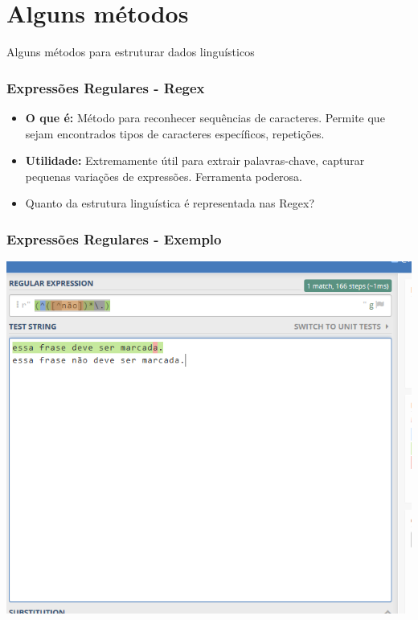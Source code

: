 \documentclass[11pt]{beamer}
\begin{document}
\section{Alguns métodos}
\begin{frame}
\begin{center}
	Alguns métodos para estruturar dados linguísticos
\end{center}
\end{frame}
\begin{frame}
\frametitle{Expressões Regulares - Regex}
\begin{itemize}
	\item \textbf{O que é:} Método para reconhecer sequências de caracteres. Permite que sejam encontrados tipos de caracteres específicos, repetições.\\
	\item \textbf{Utilidade:} Extremamente útil para extrair palavras-chave, capturar pequenas variações de expressões. Ferramenta poderosa.\\
	\item Quanto da estrutura linguística é representada nas Regex?
\end{itemize}
\end{frame}
\begin{frame}
\frametitle{Expressões Regulares - Exemplo}
\begin{center}
	\includegraphics[width=\columnwidth,height=\textheight,keepaspectratio]{Regex_bom.png}
\end{center}
\end{frame}
\end{document}
